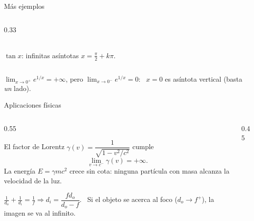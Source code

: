 \documentclass[10pt,aspectratio=169]{beamer}
\begin{document}
\begin{frame}{Más ejemplos}
\begin{columns}
\begin{column}{0.33\textwidth}
\\
      \small $\tan x$: infinitas asíntotas $x=\frac\pi2+k\pi$.
    \end{column}
  \end{columns}
  \begin{ejemplo}[6]
    $\displaystyle\lim_{x\to0^+}e^{1/x}=+\infty$, pero $\displaystyle\lim_{x\to0^-}e^{1/x}=0$: \ $x=0$ es asíntota vertical (basta \emph{un} lado).
  \end{ejemplo}
\end{frame}

\begin{frame}{Aplicaciones físicas}
  \begin{columns}
    \begin{column}{0.55\textwidth}
      \begin{ejemplo}[7: relatividad]
        El factor de Lorentz $\gamma(v)=\dfrac{1}{\sqrt{1-v^2/c^2}}$ cumple
        \[ \lim_{v\to c^-}\gamma(v)=+\infty. \]
        La energía $E=\gamma mc^2$ crece sin cota: ninguna partícula con masa alcanza la velocidad de la luz.
      \end{ejemplo}
      \begin{ejemplo}
        $\frac1{d_o}+\frac1{d_i}=\frac1f\Rightarrow d_i=\dfrac{fd_o}{d_o-f}$. \ Si el objeto se acerca al foco ($d_o\to f^+$), la imagen se va al infinito.
      \end{ejemplo}
    \end{column}
    \begin{column}{0.45\textwidth}
      \centering
    \end{column}
  \end{columns}
\end{frame}
\end{document}
